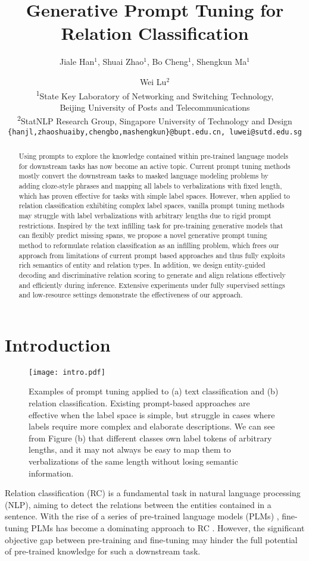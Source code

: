 \documentclass[11pt]{article}
\title{Generative Prompt Tuning for Relation Classification}
\author{
	Jiale Han$^1$, Shuai Zhao$^1$, Bo Cheng$^1$, Shengkun Ma$^1$ \and Wei Lu$^2$
	\\
	\textsuperscript{1}State Key Laboratory of Networking and Switching Technology,\\Beijing University of Posts and Telecommunications\\
	\textsuperscript{2}StatNLP Research Group, Singapore University of Technology and Design\\
	\texttt{\{hanjl,zhaoshuaiby,chengbo,mashengkun\}@bupt.edu.cn, luwei@sutd.edu.sg}
}
\begin{document}
	\maketitle
	\begin{abstract}
		Using prompts to explore the knowledge contained within pre-trained language models for downstream tasks has now become an active topic. Current prompt tuning methods mostly convert the downstream tasks to masked language modeling problems by adding cloze-style phrases and mapping all labels to verbalizations with fixed length, which has proven effective for tasks with simple label spaces.
		However, when applied to relation classification exhibiting complex label spaces, vanilla prompt tuning methods may struggle with label verbalizations with arbitrary lengths due to rigid prompt restrictions.
		Inspired by the text infilling task for pre-training generative models that can flexibly predict missing spans, we propose a novel generative prompt tuning method to reformulate relation classification as an infilling problem, which frees our approach from limitations of current prompt based approaches and thus fully exploits rich semantics of entity and relation types.
		In addition, we design entity-guided decoding and discriminative relation scoring to generate and align relations effectively and efficiently during inference. Extensive experiments under fully supervised settings and low-resource settings demonstrate the effectiveness of our approach.
	\end{abstract}
	
	\section{Introduction}
	
	\begin{figure}[t!]
\centering
		\texttt{[image: intro.pdf]}
		\caption{Examples of prompt tuning applied to (a) text classification and (b) relation classification. Existing prompt-based approaches are effective when the label space is simple, but struggle in cases where labels require more complex and elaborate descriptions. We can see from Figure (b) that different classes own label tokens of arbitrary lengths, and it may not always be easy to map them to verbalizations of the same length without losing semantic information.}
		\label{intro} 
	\end{figure}
	Relation classification (RC) is a fundamental task in natural language processing (NLP), aiming to detect the relations between the entities contained in a sentence. With the rise of a series of pre-trained language models (PLMs) \cite{devlin-etal-2019-bert, DBLP:journals/corr/abs-1907-11692, lewis-etal-2020-bart, DBLP:journals/jmlr/RaffelSRLNMZLL20}, fine-tuning PLMs has become a dominating approach to RC \cite{joshi-etal-2020-spanbert, DBLP:conf/aaai/XueSZC21, DBLP:journals/corr/abs-2102-01373}. However, the significant objective gap between pre-training and fine-tuning may hinder the full potential of pre-trained knowledge for such a downstream task.
	
\end{document}

